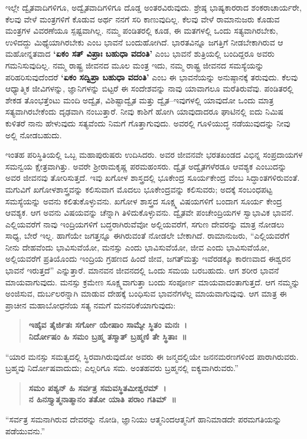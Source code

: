 ಇಲ್ಲೇ ದ್ವೈತವಾದಿಗಳಿಗೂ, ಅದ್ವೈತವಾದಿಗಳಿಗೂ ದೊಡ್ಡ ಅಂತರವಿರುವುದು. ಶ್ರೇಷ್ಠ ಭಾಷ್ಯಕಾರರಾದ ಶಂಕರಾಚಾರ್ಯರೇ, ಕೆಲವು ವೇಳೆ ಮಂತ್ರಗಳಿಗೆ ಕೊಡುವ ಅರ್ಥ ನನಗೆ ಸರಿ ಕಾಣುವುದಿಲ್ಲ. ಕೆಲವು ವೇಳೆ ರಾಮಾನುಜರು ಕೊಡುವ ಮಂತ್ರಗಳ ವಿವರಣೆಯೂ ಸ್ಪಷ್ಟವಾಗಿಲ್ಲ. ನಮ್ಮ ಪಂಡಿತರಲ್ಲಿ ಕೂಡ, ಈ ಮತಗಳಲ್ಲಿ ಒಂದು ಸತ್ಯವಾಗಿರಬೇಕು, ಉಳಿದದ್ದು ಮಿಥ್ಯೆಯಾಗಿರಬೇಕು ಎಂಬ ಭಾವನೆ ಬಂದುಹೋಗಿದೆ. ಭಾರತವಿನ್ನೂ ಜಗತ್ತಿಗೆ ನೀಡಬೇಕಾಗಿರುವ ಆ ಮಹೋನ್ನತವಾದ \textbf{‘ಏಕಂ ಸತ್​ ವಿಪ್ರಾಃ ಬಹುಧಾ ವದಂತಿ’} ಎಂಬ ಭಾವನೆ ಶುತ್ರಿಯಲ್ಲಿ ಬಂದಿದ್ದರೂ ಅವರು ಗಮನಿಸುವುದಿಲ್ಲ. ನಮ್ಮ ರಾಷ್ಟ್ರ ಜೀವನದ ಮೂಲ ಮಂತ್ರ ಇದು, ನಮ್ಮ ರಾಷ್ಟ್ರ ಜೀವನದ ಸಮಸ್ಯೆಯನ್ನು ಪರಿಹರಿಸುವುದೆಂದರೆ \textbf{‘ಏಕಂ ಸದ್ವಿಪ್ರಾ ಬಹುಧಾ ವದಂತಿ’} ಎಂಬ ಈ ಭಾವನೆಯನ್ನು ಅನುಷ್ಠಾನಕ್ಕೆ ತರುವುದು. ಕೆಲವು ಆಧ್ಯಾತ್ಮಿಕ ಜೀವಿಗಳನ್ನು, ಜ್ಞಾನಿಗಳನ್ನು ಬಿಟ್ಟರೆ ಈ ಸಂದೇಶವನ್ನು ನಾವು ಯಾವಾಗಲೂ ಮರೆತಿರುವೆವು. ಪಂಡಿತರಲ್ಲಿ ಶೇಕಡ ತೊಂಭತ್ತೆಂಟು ಮಂದಿ ಅದ್ವೈತ, ವಿಶಿಷ್ಟಾದ್ವೈತ ಮತ್ತು ದ್ವೈತ–ಇವುಗಳಲ್ಲಿ ಯಾವುದೋ ಒಂದು ಮಾತ್ರ ಸತ್ಯವಾಗಿರಬೇಕೆಂದು ದೃಢವಾಗಿ ನಂಬುತ್ತಾರೆ. ನೀವು ಕಾಶಿಗೆ ಹೋಗಿ ಯಾವುದಾದರೂ ಘಾಟಿನಲ್ಲಿ ಐದು ನಿಮಿಷ ಕುಳಿತರೆ ನಾನು ಹೇಳುವುದು ಸತ್ಯವೆಂದು ನಿಮಗೆ ಗೊತ್ತಾಗುವುದು. ಅವರಲ್ಲಿ ಗೂಳಿಯುದ್ಧ ನಡೆಯುವುದನ್ನು ನೀವು ಅಲ್ಲಿ ನೋಡಬಹುದು.

ಇಂತಹ ಪರಿಸ್ಥಿತಿಯಲ್ಲಿ ಒಬ್ಬ ಮಹಾಪುರುಷರು ಉದಿಸಿದರು. ಅವರ ಜೀವನವೇ ಭರತಖಂಡದ ವಿಭಿನ್ನ ಸಂಪ್ರದಾಯಗಳ ಸಮನ್ವಯ ಕ್ಷೇತ್ರವಾಗಿತ್ತು. ಅವರೇ ಶ‍್ರೀರಾಮಕೃಷ್ಣ ಪರಮಹಂಸರು. ದ್ವೈತ ಅದ್ವೈತಗಳೆರಡೂ ಆವಶ್ಯಕ ಎಂಬುದನ್ನು ಅವರ ಜೀವನವು ತೋರಿಸುತ್ತದೆ. ಇವು ಖಗೋಳ ಶಾಸ್ತ್ರದಲ್ಲಿ ಭೂಕೇಂದ್ರ  ಸೂರ್ಯಕೇಂದ್ರ  ವೆಂಬ ಸಿದ್ಧಾಂತಗಳಿರುವಂತೆ. ಮಗುವಿಗೆ ಖಗೋಳಶಾಸ್ತ್ರವನ್ನು ಕಲಿಸುವಾಗ ಮೊದಲು ಭೂಕೇಂದ್ರವನ್ನು ಕಲಿಸುವರು; ಅದಕ್ಕೆ ಸಂಬಂಧಪಟ್ಟ ಸಮಸ್ಯೆಯನ್ನು ಅವನು ಕಲಿತುಕೊಳ್ಳುವನು. ಖಗೋಳ ಶಾಸ್ತ್ರದ ಸೂಕ್ಷ್ಮ ವಿಷಯಗಳಿಗೆ ಬಂದಾಗ ಸೂರ್ಯ ಕೇಂದ್ರ ಆವಶ್ಯಕ. ಆಗ ಅವನು ವಿಷಯವನ್ನು ಚೆನ್ನಾಗಿ ತಿಳಿದುಕೊಳ್ಳುವನು. ದ್ವೈತವೇ ಪಂಚೇಂದ್ರಿಯಗಳ ಸ್ವಾಭಾವಿಕ ಭಾವನೆ. ಎಲ್ಲಿಯವರೆಗೆ ನಾವು ಇಂದ್ರಿಯಗಳಿಗೆ ಬದ್ಧರಾಗಿರುವೆವೋ ಅಲ್ಲಿಯವರೆಗೆ, ಸಗುಣ ದೇವರನ್ನು ಮಾತ್ರ ನೋಡಲು ಸಾಧ್ಯ, ಬೇರೆ ಇಲ್ಲ. ಹಾಗೆಯೇ ಜಗತ್ತನ್ನೂ ಈಗಿರುವಂತೆ ನೋಡಲೇ ಬೇಕಾಗಿದೆ. ರಾಮಾನುಜರು, “ಎಲ್ಲಿಯವರೆಗೆ ನೀನು ದೇಹವೆಂದು ಭಾವಿಸುವೆಯೋ, ಮನಸ್ಸು ಎಂದು ಭಾವಿಸುವೆಯೋ, ಜೀವ ಎಂದು ಭಾವಿಸುವೆಯೋ, ಅಲ್ಲಿಯವರೆಗೆ ಪ್ರತಿಯೊಂದು ಇಂದ್ರಿಯ ಗ್ರಹಣದ ಹಿಂದೆ ಜೀವ, ಜಗತ್​ ಮತ್ತು ಇವೆರಡಕ್ಕೂ ಕಾರಣವಾದ ಈಶ್ವರನ ಭಾವನೆ ಇರುತ್ತದೆ” ಎನ್ನುತ್ತಾರೆ. ಮಾನವನ ಜೀವನದಲ್ಲಿ ಒಂದು ಸಮಯ ಬರಬಹುದು. ಆಗ ಶರೀರ ಭಾವನೆ ಮಾಯವಾಗುವುದು. ಮನಸ್ಸು ಕ್ರಮೇಣ ಸೂಕ್ಷ್ಮವಾಗುತ್ತಾ ಬಂದು ಸಂಪೂರ್ಣ ಮಾಯವಾದಂತಾಗುತ್ತದೆ. ಆಗ ನಮ್ಮನ್ನು ಅಂಜಿಸುವ, ದುರ್ಬಲರನ್ನಾಗಿ ಮಾಡುವ ದೇಹಕ್ಕೆ ಬಂಧಿಸುವ ಭಾವನೆಗಳೆಲ್ಲ ಮಾಯವಾಗುವುವು. ಆಗ ಮಾತ್ರ ಈ ಪ್ರಾಚೀನ ಮಹಾಬೋಧನೆಯ ಸತ್ಯ ನಮಗೆ ಮನವರಿಕೆಯಾಗುವುದು:

\begin{verse}
\textbf{ಇಹೈವ ತೈರ್ಜಿತಃ ಸರ್ಗೋ ಯೇಷಾಂ ಸಾಮ್ಯೇ ಸ್ಥಿತಂ ಮನಃ~।}\\\textbf{ನಿರ್ದೋಷಂ ಹಿ ಸಮಂ ಬ್ರಹ್ಮ ತಸ್ಮಾತ್​ ಬ್ರಹ್ಮಣಿ ತೇ ಸ್ಥಿತಾಃ~॥}
\end{verse}

“ಯಾರ ಮನಸ್ಸು ಸಮತ್ವದಲ್ಲಿ ಸ್ಥಿರವಾಗಿರುವುದೋ ಅವರು ಈ ಜನ್ಮದಲ್ಲಿಯೇ ಜನನಮರಣಗಳಿಂದ ಪಾರಾಗಿರುವರು. ಬ್ರಹ್ಮವು ನಿರ್ದೋಷವಾದುದು; ಎಲ್ಲರಿಗೂ ಸಮ. ಅಂತಹವರು ಬ್ರಹ್ಮನಲ್ಲಿ ಐಕ್ಯವಾಗಿರುವರು.”

\begin{verse}
\textbf{ಸಮಂ ಪಶ್ಯನ್​ ಹಿ ಸರ್ವತ್ರ ಸಮವಸ್ಥಿತಮೀಶ್ವರಮ್​~।}\\\textbf{ನ ಹಿನಸ್ತ್ಯಾತ್ಮನಾತ್ಮಾನಂ ತತೋ ಯಾತಿ ಪರಾಂ ಗತಿಮ್​~॥}
\end{verse}

“ಸರ್ವತ್ರ ಸಮನಾಗಿರುವ ದೇವರನ್ನು ನೋಡಿ, ಜ್ಞಾನಿಯು ಆತ್ಮನಿಂದ\break ಆತ್ಮನಿಗೆ ಹಾನಿಮಾಡದೇ ಪರಮಗತಿಯನ್ನು ಪಡೆಯುವನು.”


